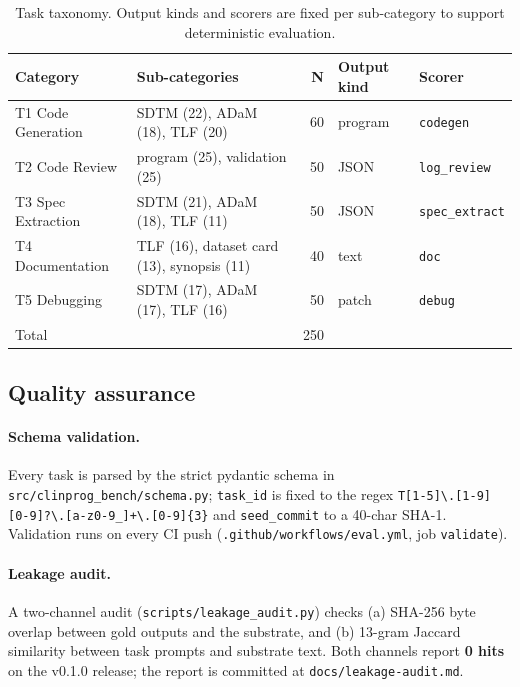 \begin{table}[h]
\centering
\small
\caption{Task taxonomy. Output kinds and scorers are fixed per
sub-category to support deterministic evaluation.}
\label{tab:taxonomy}
\begin{tabular}{llrll}
\toprule
Category & Sub-categories & N & Output kind & Scorer \\
\midrule
T1 Code Generation & SDTM (22), ADaM (18), TLF (20)         & 60 & program & \texttt{codegen} \\
T2 Code Review     & program (25), validation (25)          & 50 & JSON    & \texttt{log\_review} \\
T3 Spec Extraction & SDTM (21), ADaM (18), TLF (11)         & 50 & JSON    & \texttt{spec\_extract} \\
T4 Documentation   & TLF (16), dataset card (13), synopsis (11) & 40 & text & \texttt{doc} \\
T5 Debugging       & SDTM (17), ADaM (17), TLF (16)         & 50 & patch   & \texttt{debug} \\
\midrule
Total              &                                        & 250 & & \\
\bottomrule
\end{tabular}
\end{table}

\subsection{Quality assurance}

\paragraph{Schema validation.} Every task is parsed by the strict pydantic
schema in \texttt{src/clinprog\_bench/schema.py}; \texttt{task\_id} is fixed
to the regex \texttt{T[1-5]\textbackslash.[1-9][0-9]?\textbackslash.[a-z0-9\_]+\textbackslash.[0-9]\{3\}}
and \texttt{seed\_commit} to a 40-char SHA-1. Validation runs on every CI
push (\texttt{.github/workflows/eval.yml}, job \texttt{validate}).

\paragraph{Leakage audit.} A two-channel audit (\texttt{scripts/leakage\_audit.py})
checks (a) SHA-256 byte overlap between gold outputs and the substrate, and
(b) 13-gram Jaccard similarity between task prompts and substrate text. Both
channels report \textbf{0 hits} on the v0.1.0 release; the report is
committed at \texttt{docs/leakage-audit.md}.

